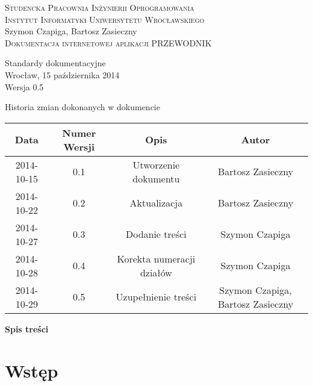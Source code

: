 \documentclass[12pt,a4paper]{report}
\makeatletter
\newcommand*{\toccontents}{\@starttoc{toc}}
\makeatother
\begin{document}
\newcommand{\itab}[1]{\hspace{4em}\rlap{#1}}
\newcommand{\tab}[1]{\hspace{.2\textwidth}\rlap{#1}}

\begin{titlepage}
\begin{center}
\textsc{Studencka Pracownia Inżynierii Oprogramowania}\\[0.5cm]
\textsc{Instytut Informatyki Uniwersytetu Wrocławskiego}\\[7.3cm]

Szymon Czapiga, Bartosz Zasieczny\\[1.0cm]

\LARGE{\textsc{Dokumentacja internetowej  aplikacji PRZEWODNIK}}\\[1.0cm]

\begin{normalsize}
Standardy dokumentacyjne\\[7.0cm]

Wrocław, 15 października 2014\\[0.5cm]
Wersja 0.5
\end{normalsize}
\end{center}
\end{titlepage}

\begin{table}[h1]
 \itab \textit{Tabela 0.} Historia zmian dokonanych w dokumencie
  \begin{center}
    \begin{tabular}{| c | c | c | c |}
    \hline
    Data & Numer Wersji & Opis & Autor \\
    \hline \hline
    2014-10-15 & 0.1 & Utworzenie dokumentu & Bartosz Zasieczny \\
    \hline
    2014-10-22 & 0.2 & Aktualizacja & Bartosz Zasieczny \\
    \hline
    2014-10-27 & 0.3 & Dodanie treści  & Szymon Czapiga \\
    \hline
    2014-10-28 & 0.4 & Korekta numeracji działów & Szymon Czapiga \\
    \hline
    2014-10-29 & 0.5 & Uzupełnienie treści & Szymon Czapiga, Bartosz Zasieczny \\
    \hline
    \end{tabular}
  \end{center}
\end{table}
\textbf{\large{Spis treści}}\\[0.3cm]
\toccontents
\newpage
\section{Wstęp}
\end{document}

